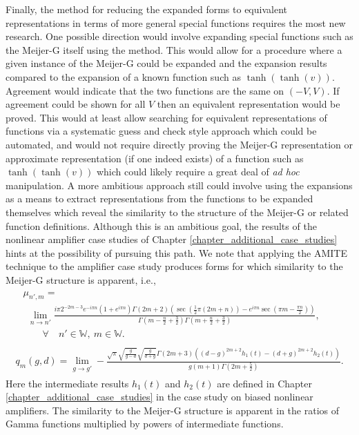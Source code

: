 Finally, the method for reducing the expanded forms to equivalent representations in terms of more general special functions requires the most new research.  One possible direction would involve expanding special functions such as the Meijer-G itself using the method.  This would allow for a procedure where a given instance of the Meijer-G could be expanded and the expansion results compared to the expansion of a known function such as $\tanh(\tanh(v))$.  Agreement would indicate that the two functions are the same on $(-V, V)$.  If agreement could be shown for all $V$ then an equivalent representation would be proved.  This would at least allow searching for equivalent representations of functions via a systematic guess and check style approach which could be automated, and would not require directly proving the Meijer-G representation or approximate representation (if one indeed exists) of a function such as $\tanh(\tanh(v))$ which could likely require a great deal of \textit{ad hoc} manipulation.  A more ambitious approach still could involve using the expansions as a means to extract representations from the functions to be expanded themselves which reveal the similarity to the structure of the Meijer-G or related function definitions.  Although this is an ambitious goal, the results of the nonlinear amplifier case studies of Chapter \ref{chapter_additional_case_studies} hints at the possibility of pursuing this path.  We note that applying the AMITE technique to the amplifier case study produces forms for which similarity to the Meijer-G structure is apparent, i.e.,
\begin{align}
	\begin{split}
	&\mu_{n', m} =\nonumber\\
	&\ \ \lim_{n \to n'}
	\frac{i \pi  2^{-2 m-3} e^{-i \pi  n} \left(1+e^{i \pi  n}\right) \Gamma (2 m+2) \left(\sec \left(\frac{1}{2} \pi  (2 m+n)\right)-e^{i \pi  n} \sec \left(\pi  m-\frac{\pi  n}{2}\right)\right)}{\Gamma \left(m-\frac{n}{2}+\frac{3}{2}\right) \Gamma \left(m+\frac{n}{2}+\frac{3}{2}\right)}, \\
	&\quad\quad\forall\quad n' \in \mathbb{W},\ m \in \mathbb{W}.
	\end{split} \\
    \begin{split}
	q_m(g,d)
	= \lim_{g \to g'}
	-\frac{\sqrt{\pi } \sqrt{\frac{g}{g-d}} \sqrt{\frac{g}{d+g}} \Gamma (2 m+3) \left((d-g)^{2 m+2} h_1(t) - (d+g)^{2 m+2}h_2(t)\right)}{g (m+1) \Gamma \left(2 m+\frac{5}{2}\right)}.
	\end{split}
\end{align}
Here the intermediate results $h_1(t)$ and $h_2(t)$ are defined in Chapter \ref{chapter_additional_case_studies} in the case study on biased nonlinear amplifiers.  The similarity to the Meijer-G structure is apparent in the ratios of Gamma functions multiplied by powers of intermediate functions.

